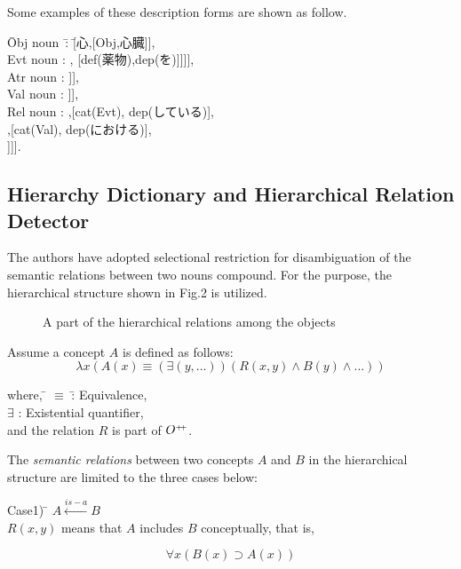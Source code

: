 Some examples of these description forms are shown as follow.
\begin{tabbing}
        \= Obj noun\  \= : \= [心,[Obj,心臓]],\\
        \> Evt noun \> : \> [投与,[Evt,[[def(医療従事者),dep(が))],
[def(薬物),dep(を)]]]],\\
        \> Atr noun \>: \> [湿度,[Atr,[dep(である)]]],\\
        \> Val noun \>: \> [高級,[Val,[dep(な)]]],\\
        \> Rel noun \>: \> [間,[Rel,[[cat(Obj),dep(における)],[cat(Evt),
dep(している)], \\
        \>          \>  ,[cat(Val),
dep(における)],\\
        \>          \>  ]]].
\end{tabbing}

\subsection{Hierarchy Dictionary and Hierarchical Relation Detector}
The authors have adopted selectional restriction for disambiguation of
the semantic relations between two nouns compound. For the
purpose, the hierarchical structure shown in Fig.2 is utilized.

\begin{figure}[t]
\begin{center}
\unitlength=1mm
\end{center}
\vspace{-3mm}
\caption{A part of the hierarchical relations among the objects}
\vspace{1mm}
\end{figure}


Assume a concept $A$ is defined as follows:
\begin{equation}
 \lambda x (A(x) \equiv (\exists(y,...))(R(x,y) \wedge B(y) \wedge ...))
\end{equation}
\begin{tabbing}
 where, \= $\equiv$ \= : Equivalence,\\
       \> $\exists$ \> : Existential quantifier,\\
       \> and the relation $R$ is part of $O^{\mbox{\tiny $+\!+$}}$.
\end{tabbing}
        
The {\it semantic relations} between two concepts $A$ and $B$ in the
hierarchical structure are limited to the three cases below:
\begin{tabbing}
 Case1)  \= $A \stackrel{is-a}{\leftarrow} B$\\
         \> $R(x,y)$ means that $A$ includes $B$ conceptually, that is,
\end{tabbing}
\begin{equation} 
            \forall x(B(x)\supset A(x))
\end{equation}


